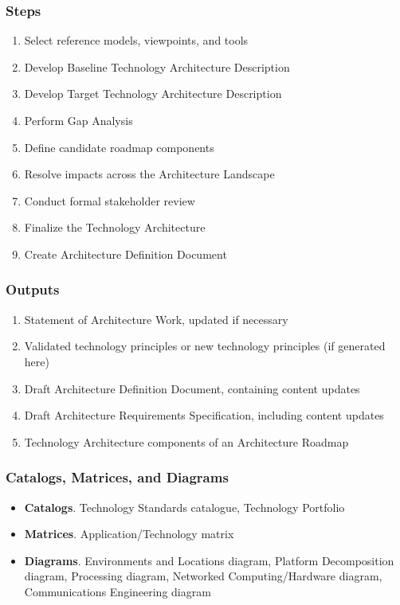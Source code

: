 \documentclass[aspectratio=169, table]{beamer}
\begin{document}
	\begin{frame}
		\frametitle{Steps}
		\vspace{20pt}
		\begin{enumerate}
			\item Select reference models, viewpoints, and tools
			\item Develop Baseline Technology Architecture Description
			\item Develop Target Technology Architecture Description
			\item Perform Gap Analysis
			\item Define candidate roadmap components
			\item Resolve impacts across the Architecture Landscape
			\item Conduct formal stakeholder review
			\item Finalize the Technology Architecture
			\item Create Architecture Definition Document
		\end{enumerate}
	\end{frame}
	
	\begin{frame}
		\frametitle{Outputs}
		\begin{enumerate}
			\item Statement of Architecture Work, updated if necessary
			\item Validated technology principles or new technology principles (if generated here)
			\item Draft Architecture Definition Document, containing content updates
			\item Draft Architecture Requirements Specification, including content updates
			\item Technology Architecture components of an Architecture Roadmap
		\end{enumerate}
	\end{frame}
	
	\begin{frame}
		\frametitle{Catalogs, Matrices, and Diagrams}
		\begin{itemize}
			\item \textbf{Catalogs}. Technology Standards catalogue, Technology Portfolio
			\item \textbf{Matrices}. Application/Technology matrix
			\item \textbf{Diagrams}. Environments and Locations diagram, Platform Decomposition diagram, Processing diagram, Networked Computing/Hardware diagram, Communications Engineering diagram
		\end{itemize}
	\end{frame}
	
\end{document}
